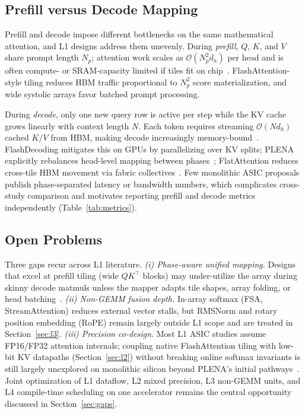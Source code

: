 \documentclass[conference]{IEEEtran}
\begin{document}
\subsection{Prefill versus Decode Mapping}
\label{sec:l1-prefill-decode}

Prefill and decode impose different bottlenecks on the same mathematical attention, and L1 designs address them unevenly.
During \emph{prefill}, $Q$, $K$, and $V$ share prompt length $N_p$; attention work scales as $\mathcal{O}(N_p^2 d_h)$ per head and is often compute- or SRAM-capacity limited if tiles fit on chip~\cite{dao2022flashattention,lin2025systolicattention}.
FlashAttention-style tiling reduces HBM traffic proportional to $N_p^2$ score materialization, and wide systolic arrays favor batched prompt processing.

During \emph{decode}, only one new query row is active per step while the KV cache grows linearly with context length $N$.
Each token requires streaming $\mathcal{O}(N d_h)$ cached $K/V$ from HBM, making decode increasingly memory-bound~\cite{dao2023flashdecoding,bitdecoding2026}.
FlashDecoding mitigates this on GPUs by parallelizing over KV splits; PLENA explicitly rebalances head-level mapping between phases~\cite{plena2025}; FlatAttention reduces cross-tile HBM movement via fabric collectives~\cite{flatattention2026}.
Few monolithic ASIC proposals publish phase-separated latency or bandwidth numbers, which complicates cross-study comparison and motivates reporting prefill and decode metrics independently (Table~\ref{tab:metrics}).

\subsection{Open Problems}
\label{sec:l1-open}

Three gaps recur across L1 literature.
\emph{(i) Phase-aware unified mapping.} Designs that excel at prefill tiling (wide $QK^\top$ blocks) may under-utilize the array during skinny decode matmuls unless the mapper adapts tile shapes, array folding, or head batching~\cite{plena2025,streamattention2025,dao2023flashdecoding}.
\emph{(ii) Non-GEMM fusion depth.} In-array softmax (FSA, StreamAttention) reduces external vector stalls, but RMSNorm and rotary position embedding (RoPE) remain largely outside L1 scope and are treated in Section~\ref{sec:l3}.
\emph{(iii) Precision co-design.} Most L1 ASIC studies assume FP16/FP32 attention internals; coupling native FlashAttention tiling with low-bit KV datapaths (Section~\ref{sec:l2}) without breaking online softmax invariants is still largely unexplored on monolithic silicon beyond PLENA's initial pathways~\cite{plena2025,liu2024kivi,sawint42026}.
Joint optimization of L1 dataflow, L2 mixed precision, L3 non-GEMM units, and L4 compile-time scheduling on one accelerator remains the central opportunity discussed in Section~\ref{sec:gaps}.
\end{document}
